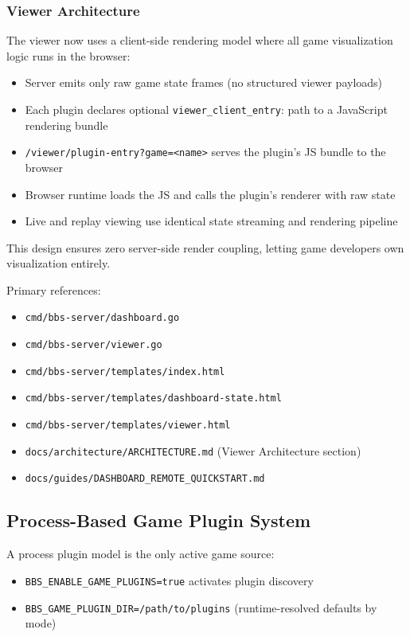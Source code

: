 \documentclass[11pt]{article}
\begin{document}
\subsubsection{Viewer Architecture}
The viewer now uses a client-side rendering model where all game visualization logic runs in the browser:
\begin{itemize}[leftmargin=*]
  \item Server emits only raw game state frames (no structured viewer payloads)
  \item Each plugin declares optional \texttt{viewer\_client\_entry}: path to a JavaScript rendering bundle
  \item \texttt{/viewer/plugin-entry?game=<name>} serves the plugin's JS bundle to the browser
  \item Browser runtime loads the JS and calls the plugin's renderer with raw state
  \item Live and replay viewing use identical state streaming and rendering pipeline
\end{itemize}

This design ensures zero server-side render coupling, letting game developers own visualization entirely.

Primary references:
\begin{itemize}[leftmargin=*]
  \item \texttt{cmd/bbs-server/dashboard.go}
  \item \texttt{cmd/bbs-server/viewer.go}
  \item \texttt{cmd/bbs-server/templates/index.html}
  \item \texttt{cmd/bbs-server/templates/dashboard-state.html}
  \item \texttt{cmd/bbs-server/templates/viewer.html}
  \item \texttt{docs/architecture/ARCHITECTURE.md} (Viewer Architecture section)
  \item \texttt{docs/guides/DASHBOARD\_REMOTE\_QUICKSTART.md}
\end{itemize}

\subsection{Process-Based Game Plugin System}
A process plugin model is the only active game source:
\begin{itemize}[leftmargin=*]
  \item \texttt{BBS\_ENABLE\_GAME\_PLUGINS=true} activates plugin discovery
  \item \texttt{BBS\_GAME\_PLUGIN\_DIR=/path/to/plugins} (runtime-resolved defaults by mode)
\end{itemize}
\end{document}
